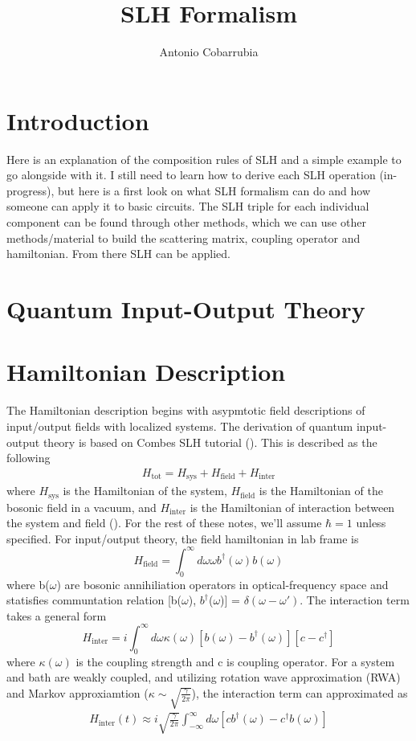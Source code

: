 \documentclass[a4paper]{article}
\title{SLH Formalism}
\author[1]{Antonio Cobarrubia}
\affil[1]{Department of Physics, San Diego State University, San Diego, CA 92182}
\date{}
\theoremstyle{definition}
\begin{document}
\maketitle

\doublespacing
\section{Introduction}
Here is an explanation of the composition rules of SLH and a simple example to go alongside with it. I still need to learn how to derive each SLH operation (in-progress), but here is a first look on what SLH formalism can do and how someone can apply it to basic circuits. The SLH triple for each individual component can be found through other methods, which we can use other methods/material to build the scattering matrix, coupling operator and hamiltonian. From there SLH can be applied. 
\section{Quantum Input-Output Theory}

\section*{Hamiltonian Description}
The Hamiltonian description begins with asypmtotic field descriptions of input/output fields with localized systems. The derivation of quantum input-output theory is based on Combes SLH tutorial (\citealt{Combes_2017}). This is described as the following
\begin{align*}
H_{\text{tot}} = H_{\text{sys}} + H_{\text{field}} + H_{\text{inter}} 
\end{align*}
where $H_{\text{sys}}$ is the Hamiltonian of the system, $H_{\text{field}} $ is the Hamiltonian of the bosonic field in a vacuum, and $H_{\text{inter}} $ is the Hamiltonian of interaction between the system and field (\citealp{Gardiner_2004}). For the rest of these notes, we'll assume $\hbar = 1$ unless specified. For input/output theory, the field hamiltonian in lab frame is 
$$
H_{\text{field}} = \int_0^\infty d\omega \omega b^\dagger(\omega) b(\omega)
$$
where b($\omega$) are bosonic annihiliation operators in optical-frequency space  and statisfies communtation relation [b($\omega$), $b^\dagger$($\omega$)] = $\delta(\omega - \omega')$. The interaction term takes a general form 
$$
H_{\text{inter}} = i \int_0^\infty d\omega \kappa(\omega)[b(\omega)-b^\dagger(\omega)][c-c^\dagger]
$$
where $\kappa(\omega)$ is the coupling strength and c is coupling operator. For a system and bath are weakly coupled, and utilizing rotation wave approximation (RWA) and Markov approxiamtion ($\kappa \sim \sqrt{\frac{\gamma}{2\pi}}$), the interaction term can approximated as 
\begin{align*}
    H_{\text{inter}}(t) \approx i \sqrt{\frac{\gamma}{2\pi}} \int_{-\infty}^\infty d\omega [cb^\dagger(\omega) - c^\dagger b(\omega)]
\end{align*}
\end{document}

